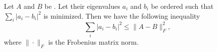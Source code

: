 \documentclass[12pt]{article}
\begin{document}
Let $A$ and $B$ be . Let their
eigenvalues $a_i$ and $b_i$ be ordered such that $\sum_i |a_i-b_i|^2$ is
minimized. Then we have the following inequality
\[
  \sum_i |a_i-b_i|^2 \le \|A-B\|_F^2,
\]
where $\|\cdot\|_F$ is the Frobenius matrix norm.
\end{document}
